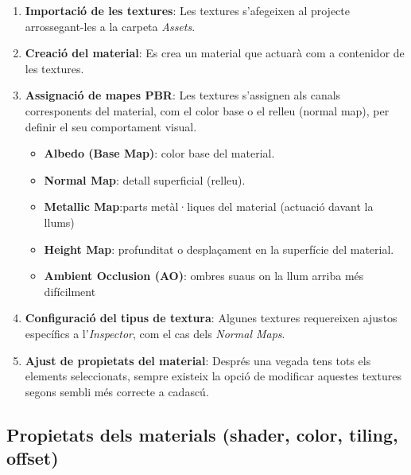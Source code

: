 \documentclass[12pt,a4paper]{report}
\begin{document}
\begin{enumerate}

\item \textbf{Importació de les textures}: Les textures s'afegeixen al projecte arrossegant-les a la carpeta \textit{Assets}. \cite{UnityImportTextures}


\item \textbf{Creació del material}: Es crea un material que actuarà com a contenidor de les textures.

\item \textbf{Assignació de mapes PBR}: Les textures s'assignen als canals corresponents del material, com el color base o el relleu (normal map), per definir el seu comportament visual.

\begin{itemize}

\item \textbf{Albedo (Base Map)}: color base del material.

\item \textbf{Normal Map}: detall superficial (relleu).  
\item \textbf{Metallic Map}:parts metàl·liques del material (actuació davant la llums)

\item \textbf{Height Map}: profunditat o desplaçament en la superfície del material.

\item \textbf{Ambient Occlusion (AO)}: ombres suaus on la llum arriba més difícilment

\end{itemize}


\item \textbf{Configuració del tipus de textura}: Algunes textures requereixen ajustos específics a l'\textit{Inspector}, com el cas dels \textit{Normal Maps}. \cite{UnityImportTextures}


\item \textbf{Ajust de propietats del material}: Després una vegada tens tots els elements seleccionats, sempre existeix la opció de modificar aquestes textures segons sembli més correcte a cadascú.

\end{enumerate}



\subsection{Propietats dels materials (shader, color, tiling, offset)}
\end{document}
